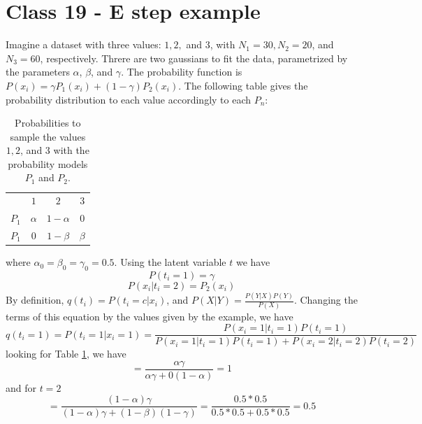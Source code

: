 \documentclass{article}
\begin{document}
\section{Class 19 - E step example}
Imagine a dataset with three values: $1, 2,$ and $3$, with $N_1 = 30, N_2 = 20$, and $N_3 = 60$, respectively. Threre are two gaussians to fit the data, parametrized by the parameters $\alpha$, $\beta$, and $\gamma$. The probability function is $P(x_i) = \gamma P_1(x_i) + (1 - \gamma)P_2(x_i)$. The following table gives the probability distribution to each value accordingly to each $P_n$:
\begin{table}[h]
    \centering
    \begin{tabular}{cccc}
         &  $1$ & $2$ & $3$ \\
         $P_1$ & $\alpha$ & $1 - \alpha$ & $0$ \\
         $P_1$ & $0$ & $1 - \beta$ & $\beta$ 
    \end{tabular}
    \caption{Probabilities to sample the values $1, 2$, and $3$ with the probability models $P_1$ and $P_2$.}
    \label{tab:EM_ex}
\end{table}
where $\alpha_0 = \beta_0 = \gamma_0 = 0.5$. Using the latent variable $t$ we have
\begin{equation}
    P(t_i = 1) = \gamma 
\end{equation}
\begin{equation}
    P(x_i|t_i = 2) = P_2(x_i)
\end{equation}
By definition, $q(t_i) = P(t_i = c|x_i)$, and $P(X|Y) = \frac{P(Y|X)P(Y)}{P(X)}$. Changing the terms of this equation by the values given by the example, we have
\begin{equation}
    q(t_i = 1) = P(t_i = 1|x_i = 1) = \frac{P(x_i = 1|t_i = 1)P(t_i = 1)}{P(x_i = 1|t_i = 1)P(t_i = 1) + P(x_i = 2|t_i = 2)P(t_i = 2)}
\end{equation}
looking for Table \ref{tab:EM_ex}, we have
\begin{equation}
    = \frac{\alpha \gamma}{\alpha \gamma + 0(1 - \alpha)} = 1
\end{equation}
and for $t = 2$
\begin{equation}
    = \frac{(1- \alpha) \gamma}{(1 - \alpha) \gamma + (1 - \beta)(1 - \gamma)} = \frac{0.5*0.5}{0.5*0.5 + 0.5*0.5} = 0.5
\end{equation}
\end{document}
